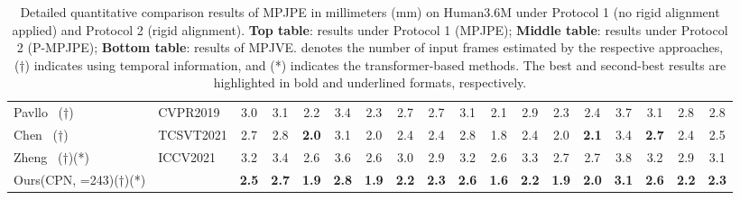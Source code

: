 \documentclass[10pt,twocolumn,letterpaper]{article}
\begin{document}
\begin{table*}[htp]
{\begin{tabular}{l@{ }l|ccccccccccccccc|c}
				Pavllo \etal~\cite{videopose3d}(†)       & CVPR2019	 & 3.0      & 3.1       & 2.2       & 3.4       & 2.3       & 2.7           & 2.7       & 3.1       & 2.1       & 2.9       & 2.3       & 2.4       & 3.7       & 3.1       & 2.8       & 2.8		\\
				Chen \etal~\cite{anatomypose}(†)       & TCSVT2021       & 2.7        & 2.8        & \textbf{2.0}        & 3.1        & 2.0        & 2.4        & 2.4        & 2.8        & 1.8        & 2.4        & 2.0        & \textbf{2.1}        & 3.4        & \textbf{2.7}        & 2.4        & 2.5 		\\
				Zheng \etal~\cite{poseformer}(†)(*)       & ICCV2021       & 3.2       & 3.4       & 2.6       & 3.6       & 2.6       & 3.0       & 2.9       & 3.2       & 2.6       & 3.3       & 2.7       & 2.7       & 3.8       & 3.2       & 2.9       & 3.1		\\
				\rowcolor[HTML]{DADADA}
				Ours(CPN, =243)(†)(*) 				  &        & \textbf{2.5}       & \textbf{2.7}       & \textbf{1.9}       & \textbf{2.8}       & \textbf{1.9}       & \textbf{2.2}       &\textbf{2.3}		  & \textbf{2.6}       & \textbf{1.6}       & \textbf{2.2}       & \textbf{1.9}       & \textbf{2.0}       & \textbf{3.1}       & \textbf{2.6}       & \textbf{2.2}       & \textbf{2.3}		\\
				\bottomrule
			\end{tabular}}
		\vspace{-0.3cm}	
		\caption{Detailed quantitative comparison results of MPJPE in millimeters (mm) on Human3.6M under Protocol 1 (no rigid alignment applied) and Protocol 2 (rigid alignment). \textbf{Top table}: results under Protocol 1 (MPJPE); \textbf{Middle table}: results under Protocol 2 (P-MPJPE); \textbf{Bottom table}: results of MPJVE.  denotes the number of input frames estimated by the respective approaches, (†) indicates using temporal information, and (*) indicates the transformer-based methods. The best and second-best results are highlighted in bold and underlined formats, respectively.}
		\label{tab:h36m_cpn_hr}
\end{table*}
\end{document}
